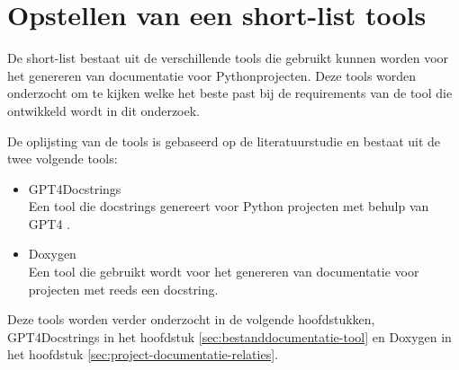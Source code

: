 \begin{table}
    \caption{Requirementsanalyse}
\end{table}

\section{Opstellen van een short-list tools}
\label{sec:long-list}
De short-list bestaat uit de verschillende tools die gebruikt kunnen worden voor het genereren van documentatie voor Pythonprojecten.
Deze tools worden onderzocht om te kijken welke het beste past bij de requirements van de tool die ontwikkeld wordt in dit onderzoek.

De oplijsting van de tools is gebaseerd op de literatuurstudie en bestaat uit de twee volgende tools:
\begin{itemize} 
\item GPT4Docstrings \autocite{Trofficus2023}\\
Een tool die docstrings genereert voor Python projecten met behulp van GPT4 \textcite{OpenAI2023}.
\item Doxygen \autocite{Doxygen2023}\\
Een tool die gebruikt wordt voor het genereren van documentatie voor projecten met reeds een docstring.
\end{itemize}

Deze tools worden verder onderzocht in de volgende hoofdstukken, GPT4Docstrings in het hoofdstuk \ref{sec:bestanddocumentatie-tool} en Doxygen in het hoofdstuk \ref{sec:project-documentatie-relaties}.